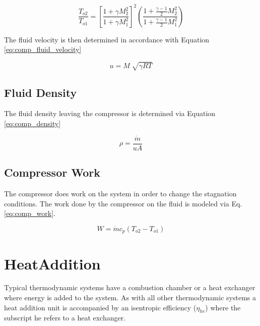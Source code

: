 \begin{equation}
\label{eq:com_mach_number}
\frac{T_{o2}}{T_{o1}} = \left[\frac{1 + \gamma M^2_2}{1 + \gamma M^2_1} \right]^2 \left(\frac{1 + \frac{\gamma-1}{2}M^2_2}{1 + \frac{\gamma - 1}{2}M^2_1} \right)
\end{equation}

\noindent The fluid velocity is then determined in accordance with Equation \ref{eq:comp_fluid_velocity}

\begin{equation}
\label{eq:comp_fluid_velocity}
u=M \sqrt[]{\gamma R T}
\end{equation}

\subsection{Fluid Density}
The fluid density leaving the compressor is determined via Equation \ref{eq:comp_density}

\begin{equation}
\label{eq:comp_density}
\rho = \frac{\dot{m}}{uA}
\end{equation}

\subsection{Compressor Work}
The compressor does work on the system in order to change the stagnation conditions.  The work done by the compressor on the fluid
is modeled via Eq. \ref{eq:comp_work}.

\begin{equation}
\label{eq:comp_work}
W = \dot{m}c_p\left(T_{o2} - T_{o1}\right)
\end{equation}

\section{HeatAddition}
Typical thermodynamic systems have a combustion chamber or a heat exchanger where energy is added to the system.  As with all other
thermodynamic systems a heat addition unit is accompanied by an isentropic efficiency ($\eta_{he}$) where the subscript he refers to 
a heat exchanger.

